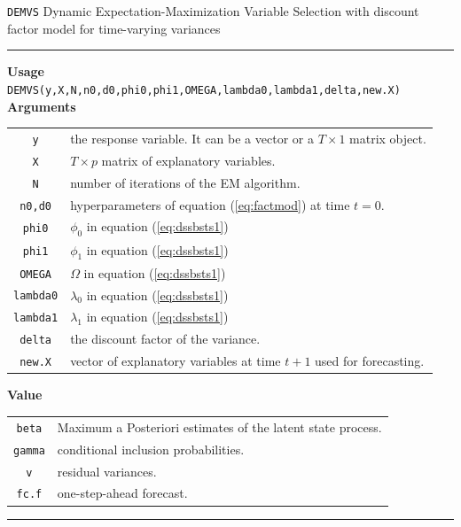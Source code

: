 \documentclass[
  12pt,
]{book}
\theoremstyle{break}
\theoremstyle{nonumberplain}
\begin{document}
\texttt{DEMVS} Dynamic Expectation-Maximization Variable Selection with
discount factor model for time-varying variances \vspace{1em}

\hrule
\vspace{1em}

\textbf{Usage}\\
\texttt{DEMVS(y,X,N,n0,d0,phi0,phi1,OMEGA,lambda0,lambda1,delta,new.X)}\\
\textbf{Arguments}

\begin{small}
\begin{longtable}{ c l }
\texttt{y} &  the response variable. It can be a vector or a $T\times1$ matrix object. \\
\texttt{X} &  $T \times p$ matrix of explanatory variables.\\
\texttt{N} &  number of iterations of the EM algorithm. \\
\texttt{n0,d0} & hyperparameters of equation (\ref{eq:factmod}) at time $t=0$.\\
\texttt{phi0} & $\phi_{0}$ in equation (\ref{eq:dssbsts1})\\
\texttt{phi1} &  $\phi_1$ in equation (\ref{eq:dssbsts1})\\
\texttt{OMEGA} &  $\Omega$ in equation (\ref{eq:dssbsts1})\\
\texttt{lambda0} &  $\lambda_0$ in equation (\ref{eq:dssbsts1})\\
\texttt{lambda1} &  $\lambda_1$ in equation (\ref{eq:dssbsts1})\\
\texttt{delta} & the discount factor of the variance.\\
\texttt{new.X} &  vector of explanatory variables at time $t+1$ used for forecasting.
\end{longtable}
\end{small}

\textbf{Value}

\begin{small}
\begin{longtable}{ c l }
\texttt{beta} & Maximum a Posteriori estimates of the latent state process. \\
\texttt{gamma} &  conditional inclusion probabilities.\\
\texttt{v} &  residual variances.\\
\texttt{fc.f} & one-step-ahead forecast.
\end{longtable}
\end{small}
\hrule
\vspace{0.5em}
\end{document}
